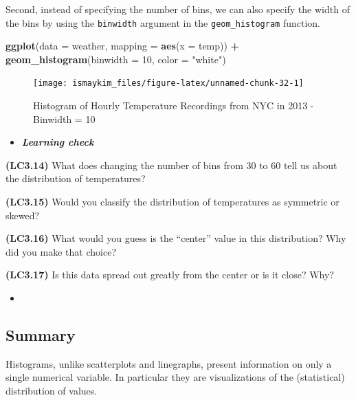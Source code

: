 \documentclass[12pt,]{krantz}
\makeatletter
\newenvironment{Shaded}{\begin{snugshade}}{\end{snugshade}}
\newcommand{\KeywordTok}[1]{\textcolor[rgb]{0.27,0.27,0.27}{\textbf{#1}}}
\newcommand{\DataTypeTok}[1]{\textcolor[rgb]{0.27,0.27,0.27}{#1}}
\newcommand{\DecValTok}[1]{\textcolor[rgb]{0.06,0.06,0.06}{#1}}
\newcommand{\StringTok}[1]{\textcolor[rgb]{0.5,0.5,0.5}{#1}}
\newcommand{\OperatorTok}[1]{\textcolor[rgb]{0.43,0.43,0.43}{\textbf{#1}}}
\newcommand{\NormalTok}[1]{#1}
\newenvironment{kframe}{%
\medskip{}
\setlength{\fboxsep}{.8em}
 \def\at@end@of@kframe{}%
 \ifinner\ifhmode%
  \def\at@end@of@kframe{\end{minipage}}%
  \begin{minipage}{\columnwidth}%
 \fi\fi%
 \def\FrameCommand##1{\hskip\@totalleftmargin \hskip-\fboxsep
 \colorbox{shadecolor}{##1}\hskip-\fboxsep
     \hskip-\linewidth \hskip-\@totalleftmargin \hskip\columnwidth}%
 \MakeFramed {\advance\hsize-\width
   \@totalleftmargin\z@ \linewidth\hsize
   \@setminipage}}%
 {\par\unskip\endMakeFramed%
 \at@end@of@kframe}
\renewenvironment{Shaded}{\begin{kframe}}{\end{kframe}}
\newenvironment{rmdblock}[1]
  {\begin{shaded*}
  \begin{itemize}
  \renewcommand{\labelitemi}{
    \raisebox{-.7\height}[0pt][0pt]{
    }
  }
  \item
  }
  {
  \end{itemize}
  \end{shaded*}
  }
\newenvironment{learncheck}
  {\begin{rmdblock}{warning}}
  {\end{rmdblock}}
\makeatother
\begin{document}
Second, instead of specifying the number of bins, we can also specify
the width of the bins by using the \texttt{binwidth} argument in the
\texttt{geom\_histogram} function.

\begin{Shaded}
\begin{Highlighting}[]
\KeywordTok{ggplot}\NormalTok{(}\DataTypeTok{data =}\NormalTok{ weather, }\DataTypeTok{mapping =} \KeywordTok{aes}\NormalTok{(}\DataTypeTok{x =}\NormalTok{ temp)) }\OperatorTok{+}
\StringTok{  }\KeywordTok{geom_histogram}\NormalTok{(}\DataTypeTok{binwidth =} \DecValTok{10}\NormalTok{, }\DataTypeTok{color =} \StringTok{"white"}\NormalTok{)}
\end{Highlighting}
\end{Shaded}

\begin{figure}

{\centering \texttt{[image: ismaykim\_files/figure-latex/unnamed-chunk-32-1]} 

}

\caption{Histogram of Hourly Temperature Recordings from NYC in 2013 - Binwidth = 10}\label{fig:unnamed-chunk-32}
\end{figure}

\begin{learncheck}
\textbf{\emph{Learning check}}
\end{learncheck}

\textbf{(LC3.14)} What does changing the number of bins from 30 to 60
tell us about the distribution of temperatures?

\textbf{(LC3.15)} Would you classify the distribution of temperatures as
symmetric or skewed?

\textbf{(LC3.16)} What would you guess is the ``center'' value in this
distribution? Why did you make that choice?

\textbf{(LC3.17)} Is this data spread out greatly from the center or is
it close? Why?

\begin{learncheck}

\end{learncheck}

\subsection{Summary}\label{summary-2}

Histograms, unlike scatterplots and linegraphs, present information on
only a single numerical variable. In particular they are visualizations
of the (statistical) distribution of values.
\end{document}
